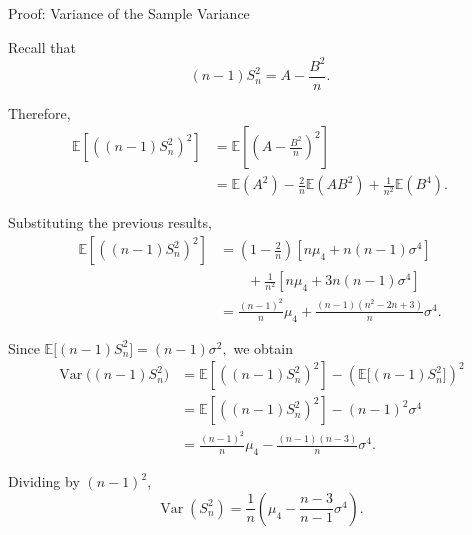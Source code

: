  \begin{frame}{Proof: Variance of the Sample Variance}

\scriptsize

Recall that
\[
(n-1)S_n^2=A-\frac{B^2}{n}.
\]

Therefore,
\[
\begin{aligned}
\mathbb{E}\left[\left((n-1)S_n^2\right)^2\right]
&=
\mathbb{E}\left[\left(A-\frac{B^2}{n}\right)^2\right]\\
&=
\mathbb{E}(A^2)
-\frac{2}{n}\mathbb{E}(AB^2)
+\frac{1}{n^2}\mathbb{E}(B^4).
\end{aligned}
\]

Substituting the previous results,
\[
\begin{aligned}
\mathbb{E}\left[\left((n-1)S_n^2\right)^2\right]
&=
\left(1-\frac{2}{n}\right)
\left[n\mu_4+n(n-1)\sigma^4\right]\\
&\qquad
+\frac{1}{n^2}
\left[n\mu_4+3n(n-1)\sigma^4\right]\\
&=
\frac{(n-1)^2}{n}\mu_4
+
\frac{(n-1)(n^2-2n+3)}{n}\sigma^4.
\end{aligned}
\]

Since $\mathbb{E}\bigl[(n-1)S_n^2\bigr]
=
(n-1)\sigma^2,$ we obtain
\[
\begin{aligned}
\operatorname{Var}\bigl((n-1)S_n^2\bigr)
&=
\mathbb{E}\left[\left((n-1)S_n^2\right)^2\right]
-
\left(
\mathbb{E}\bigl[(n-1)S_n^2\bigr]
\right)^2\\
&=
\mathbb{E}\left[\left((n-1)S_n^2\right)^2\right]
-
(n-1)^2\sigma^4\\
&=
\frac{(n-1)^2}{n}\mu_4
-
\frac{(n-1)(n-3)}{n}\sigma^4.
\end{aligned}
\]

Dividing by \((n-1)^2\),
\[
\boxed{
\operatorname{Var}(S_n^2)
=
\frac1n
\left(
\mu_4-\frac{n-3}{n-1}\sigma^4
\right)
}.
\]

\end{frame}




